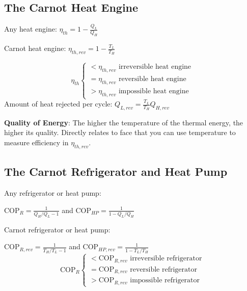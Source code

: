 \documentclass{article}
\begin{document}
\begin{multicols*}{3}
    \subsection*{The Carnot Heat Engine}
    Any heat engine: $\eta_{th}=1-\frac{Q_L}{Q_H}$\par 
    Carnot heat engine: $\eta_{th,rev}=1-\frac{T_L}{T_H}$\par 
    \begin{equation*}
        \eta_{th}\left\{
            \begin{array}{l}
                <\eta_{th,rev}\text{ irreversible heat engine}\\
                =\eta_{th,rev}\text{ reversible heat engine}\\
                >\eta_{th,rev}\text{ impossible heat engine}
            \end{array}
        \right.
    \end{equation*}
    Amount of heat rejected per cycle: $Q_{L,rev}=\frac{T_L}{T_H}Q_{H,rev}$\par 
    \textbf{Quality of Energy}: The higher the temperature of the thermal energy, the higher its quality. Directly relates to face that you can use temperature to measure efficiency in $\eta_{th,rev}$.
    \subsection*{The Carnot Refrigerator and Heat Pump}
    Any refrigerator or heat pump:\par 
    $\text{COP}_R=\frac{1}{Q_H/Q_L-1}$ and $\text{COP}_{HP}=\frac{1}{1-Q_L/Q_H}$\par 
    Carnot refrigerator or heat pump:\par 
    $\text{COP}_{R,rev}=\frac{1}{T_H/T_L-1}$ and $\text{COP}_{HP,rev}=\frac{1}{1-T_L/T_H}$
    \begin{equation*}
        \text{COP}_{R}\left\{
            \begin{array}{l}
                <\text{COP}_{R,rev}\text{ irreversible refrigerator}\\
                =\text{COP}_{R,rev}\text{ reversible refrigerator}\\
                >\text{COP}_{R,rev}\text{ impossible refrigerator}
            \end{array}
        \right.
    \end{equation*}

\end{multicols*}  
\end{document}
